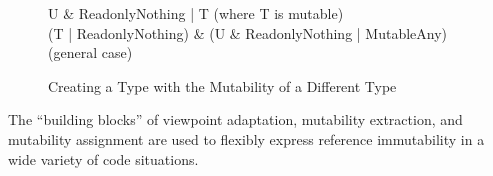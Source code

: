 \begin{figure}[h]
\center
{\cd U \& ReadonlyNothing | T} \hspace{0.4cm} (where {\cd T} is mutable) \\
{\cd (T | ReadonlyNothing) \& (U \& ReadonlyNothing | MutableAny)} \hspace{0.4cm} (general case) \\
\caption{Creating a Type with the Mutability of a Different Type}
\label{fig:assigning-mutability-to-type-2}
\end{figure}

The ``building blocks'' of viewpoint adaptation, mutability extraction, and mutability assignment are used to flexibly express reference immutability in a wide variety of code situations.



